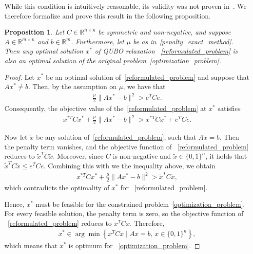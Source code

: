 \documentclass{article}
\newtheorem{prop}[thm]{Proposition}
\begin{document}
While this condition is intuitively reasonable, its validity was not proven in~\cite{Quintero2020}. We therefore formalize and prove this result in the following proposition.\\


\begin{prop}\label{penalty_general_method}
Let $C \in \mathbb{R}^{n \times n}$ be symmetric and non-negative, and suppose $A \in \mathbb{R}^{m \times n}$ and $b \in \mathbb{R}^m$. Furthermore, let $\mu$ be as in~\eqref{penalty_exact_method}. Then any optimal solution $x^*$ of QUBO relaxation ~\eqref{reformulated_problem} is also an optimal solution of the original problem~\eqref{optimization_problem}.
\end{prop}

\begin{proof}
Let $x^*$ be an optimal solution of~\eqref{reformulated_problem} and suppose that $Ax^* \neq b$. Then, by the assumption on $\mu$, we have that
\begin{align*}
\frac{\mu}{2} \|A x^* - b \|^2 > e^T C e.
\end{align*}
Consequently, the objective value of the~\eqref{reformulated_problem} at $x^*$ satisfies
\begin{align*}
x^{*T} C x^* + \frac{\mu}{2} \|A x^* - b \|^2 > x^{*T} C x^* + e^T C e.
\end{align*}

Now let $\tilde{x}$ be any solution of~\eqref{reformulated_problem}, such that $A \tilde{x} = b$. Then the penalty term vanishes, and the objective function of ~\eqref{reformulated_problem} reduces to $\tilde{x} ^T C\tilde{x}$. Moreover, since $C$ is non-negative and $\tilde{x} \in \{0,1\}^n$, it holds that $\tilde{x}^T C \tilde{x} \leq e^T C e$. Combining this with we the inequality above, we obtain
\begin{align*}
x^{*T} C x^* + \frac{\mu}{2} \|A x^* - b \|^2 > \tilde{x}^T C \tilde{x},
\end{align*}
which contradicts the optimality of $x^*$ for ~\eqref{reformulated_problem}.

Hence, $x^*$ must be feasible for the constrained problem~\eqref{optimization_problem}. For every feasible solution, the penalty term is zero, so the  objective function of ~\eqref{reformulated_problem} 
reduces to $x^T C x$. Therefore,
\begin{align*}
x^* \in \arg\min \left\{ x^T C x \mid Ax = b,\, x \in \{0,1\}^n \right\},
\end{align*}
which means that $x^*$ is optimum for ~\eqref{optimization_problem}.
\end{proof}
\end{document}
